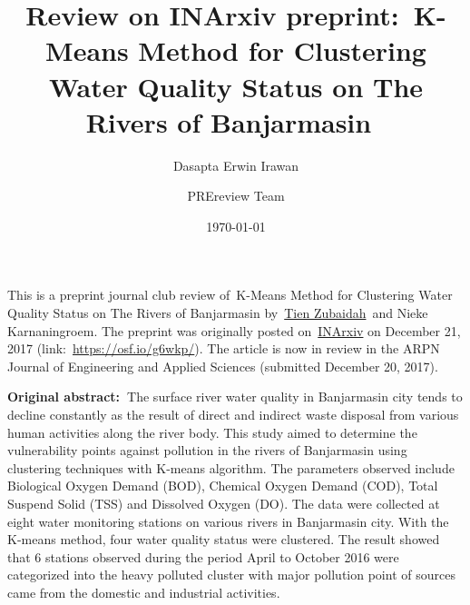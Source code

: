 \documentclass[10pt]{article}
\renewenvironment{abstract}
  {{\bfseries\noindent{\abstractname}\par\nobreak}\footnotesize}
  {\bigskip}
\begin{document}
\title{Review on INArxiv preprint:~K-Means Method for Clustering Water Quality
Status on The Rivers of Banjarmasin~}



\author[1]{Dasapta Erwin Irawan}%
\author[2]{PREreview Team}%
%
%


\vspace{-1em}



  \date{\today}


\begingroup
\let\center\flushleft
\let\endcenter\endflushleft
\maketitle
\endgroup





\begin{abstract}
This is a preprint journal club review of~K-Means Method for Clustering
Water Quality Status on The Rivers of Banjarmasin
by~\href{https://osf.io/a59hw/}{Tien Zubaidah}~and Nieke Karnaningroem.
The preprint was originally posted on~\href{http://inarxiv.id}{INArxiv}
on December 21, 2017 (link:~\url{https://osf.io/g6wkp/}). The article is
now in review in the ARPN Journal of Engineering and Applied Sciences
(submitted December 20, 2017).

\par\null

\textbf{Original abstract:~}The surface river water quality in
Banjarmasin city tends to decline constantly as the result of direct and
indirect waste disposal from various human activities along the river
body. This study aimed to determine the vulnerability points against
pollution in the rivers of Banjarmasin using clustering techniques with
K-means algorithm. The parameters observed include Biological Oxygen
Demand (BOD), Chemical Oxygen Demand (COD), Total Suspend Solid (TSS)
and Dissolved Oxygen (DO). The data were collected at eight water
monitoring stations on various rivers in Banjarmasin city. With the
K-means method, four water quality status were clustered. The result
showed that 6 stations observed during the period April to October 2016
were categorized into the heavy polluted cluster with major pollution
point of sources came from the domestic and industrial activities.%
\end{abstract}%
\end{document}
